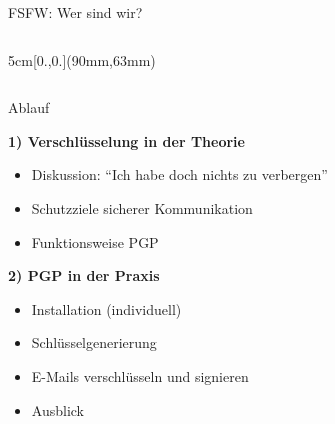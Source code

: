 \documentclass{beamer}
\begin{document}
\begin{frame}[label=ct1]{FSFW: Wer sind wir?}
\begin{columns}
\begin{textblock*}{5cm}[0.,0.](90mm,63mm)
\end{textblock*}  

~
\end{columns}

\end{frame}


\begin{frame}[label=ol1]{Ablauf}

  \textbf{1) Verschlüsselung in der Theorie}
  \begin{itemize}
   \item Diskussion: "`Ich habe doch nichts zu verbergen"'
   \item Schutzziele sicherer Kommunikation
   \item Funktionsweise PGP
  \end{itemize}

  \pause

  \textbf{2) PGP in der Praxis}
  \begin{itemize}
   \item Installation (individuell)
   \item Schlüsselgenerierung
   \item E-Mails verschlüsseln und signieren
   \item Ausblick
  \end{itemize}

\end{frame}

\end{document}
